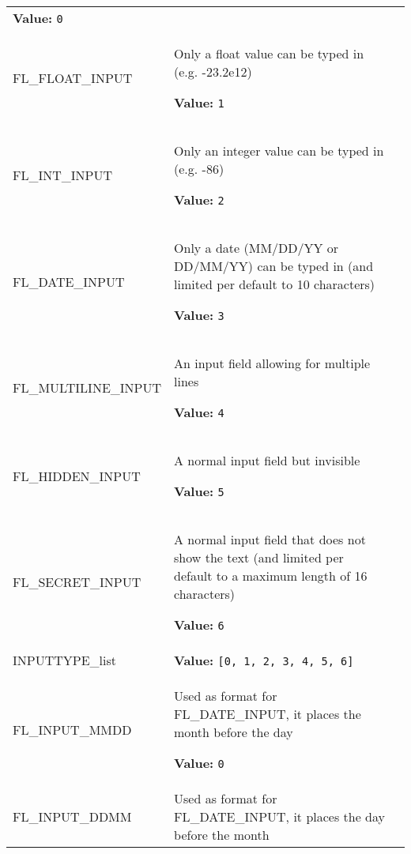 \begin{longtable}{|p{\varnamewidth}|p{\vardescrwidth}|l}
\textbf{Value:} 
{\tt 0}&\\
\cline{1-2}
\raggedright F\-L\-\_\-F\-L\-O\-A\-T\-\_\-I\-N\-P\-U\-T\- & \raggedright Only a float value can be typed in (e.g. -23.2e12)

\textbf{Value:} 
{\tt 1}&\\
\cline{1-2}
\raggedright F\-L\-\_\-I\-N\-T\-\_\-I\-N\-P\-U\-T\- & \raggedright Only an integer value can be typed in (e.g. -86)

\textbf{Value:} 
{\tt 2}&\\
\cline{1-2}
\raggedright F\-L\-\_\-D\-A\-T\-E\-\_\-I\-N\-P\-U\-T\- & \raggedright Only a date (MM/DD/YY or DD/MM/YY) can be typed in (and limited 
          per default to 10 characters)

\textbf{Value:} 
{\tt 3}&\\
\cline{1-2}
\raggedright F\-L\-\_\-M\-U\-L\-T\-I\-L\-I\-N\-E\-\_\-I\-N\-P\-U\-T\- & \raggedright An input field allowing for multiple lines

\textbf{Value:} 
{\tt 4}&\\
\cline{1-2}
\raggedright F\-L\-\_\-H\-I\-D\-D\-E\-N\-\_\-I\-N\-P\-U\-T\- & \raggedright A normal input field but invisible

\textbf{Value:} 
{\tt 5}&\\
\cline{1-2}
\raggedright F\-L\-\_\-S\-E\-C\-R\-E\-T\-\_\-I\-N\-P\-U\-T\- & \raggedright A normal input field that does not show the text (and limited per
          default to a maximum length of 16 characters)

\textbf{Value:} 
{\tt 6}&\\
\cline{1-2}
\raggedright I\-N\-P\-U\-T\-T\-Y\-P\-E\-\_\-l\-i\-s\-t\- & \raggedright \textbf{Value:} 
{\tt \texttt{[}0\texttt{, }1\texttt{, }2\texttt{, }3\texttt{, }4\texttt{, }5\texttt{, }6\texttt{]}}&\\
\cline{1-2}
\raggedright F\-L\-\_\-I\-N\-P\-U\-T\-\_\-M\-M\-D\-D\- & \raggedright Used as format for FL\_DATE\_INPUT, it places the month before 
          the day

\textbf{Value:} 
{\tt 0}&\\
\cline{1-2}
\raggedright F\-L\-\_\-I\-N\-P\-U\-T\-\_\-D\-D\-M\-M\- & \raggedright Used as format for FL\_DATE\_INPUT, it places the day before the 
          month


\end{longtable}

